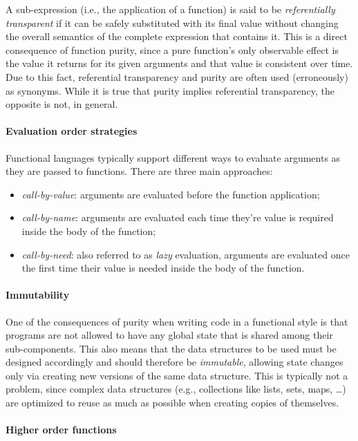 A sub-expression (i.e., the application of a function) is said to be \textit{referentially transparent} if it can be safely substituted with its final value without changing the overall semantics of the complete expression that contains it.
%
This is a direct consequence of function purity, since a pure function's only observable effect is the value it returns for its given arguments and that value is consistent over time.
%
Due to this fact, referential transparency and purity are often used (erroneously) as synonyms.
%
While it is true that purity implies referential transparency, the opposite is not, in general.

\paragraph{Evaluation order strategies}

Functional languages typically support different ways to evaluate arguments as they are passed to functions.
%
There are three main approaches:
%
\begin{itemize}
    \item \textit{call-by-value}: arguments are evaluated before the function application;
    \item \textit{call-by-name}: arguments are evaluated each time they're value is required inside the body of the function;
    \item \textit{call-by-need}: also referred to as \textit{lazy} evaluation, arguments are evaluated once the first time their value is needed inside the body of the function.
\end{itemize}

\paragraph{Immutability}

One of the consequences of purity when writing code in a functional style is that programs are not allowed to have any global state that is shared among their sub-components.
%
This also means that the data structures to be used must be designed accordingly and should therefore be \textit{immutable}, allowing state changes only via creating new versions of the same data structure.
%
This is typically not a problem, since complex data structures (e.g., collections like lists, sets, maps, \dots) are optimized to reuse as much as possible when creating copies of themselves.

\paragraph{Higher order functions}

